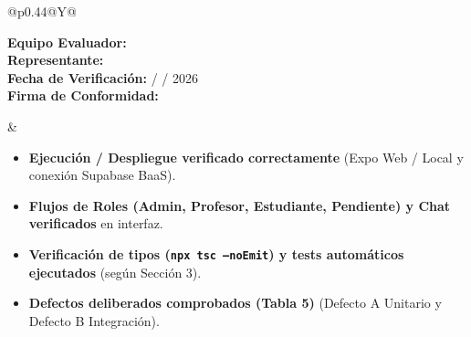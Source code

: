 \documentclass[10pt,letterpaper]{article}
\begin{document}
\begin{tcolorbox}[
  colback=atrilBg,
  colframe=atrilBorder,
  boxrule=0.9pt,
  arc=4pt,
  left=10pt,
  right=10pt,
  top=8pt,
  bottom=8pt
]
  \noindent
  \begin{tabularx}{\textwidth}{@{}p{0.44\textwidth}@{\hspace{12pt}}Y@{}}
    \begin{minipage}[t]{\linewidth}\footnotesize\color{atrilNavy}
      \vspace{2pt}
      \textbf{Equipo Evaluador:} \underline{\hspace{4.2cm}}\\[10pt]
      \textbf{Representante:} \underline{\hspace{4.6cm}}\\[10pt]
      \textbf{Fecha de Verificación:} \underline{\hspace{0.7cm}} / \underline{\hspace{0.7cm}} / 2026\\[10pt]
      \textbf{Firma de Conformidad:} \underline{\hspace{3.6cm}}
    \end{minipage}
    &
    \begin{minipage}[t]{\linewidth}\footnotesize\color{atrilTextBody}
      \begin{itemize}[leftmargin=0.5cm, itemsep=5pt, topsep=0pt, parsep=0pt]
        \item[\textcolor{atrilPrimary}{\large$\square$}] \textbf{Ejecución / Despliegue verificado correctamente} (Expo Web / Local y conexión Supabase BaaS).
        \item[\textcolor{atrilPrimary}{\large$\square$}] \textbf{Flujos de Roles (Admin, Profesor, Estudiante, Pendiente) y Chat verificados} en interfaz.
        \item[\textcolor{atrilPrimary}{\large$\square$}] \textbf{Verificación de tipos (\texttt{npx tsc --noEmit}) y tests automáticos ejecutados} (según Sección 3).
        \item[\textcolor{atrilPrimary}{\large$\square$}] \textbf{Defectos deliberados comprobados (Tabla 5)} (Defecto A Unitario y Defecto B Integración).
      \end{itemize}
    \end{minipage}
  \end{tabularx}
\end{tcolorbox}
\end{document}
